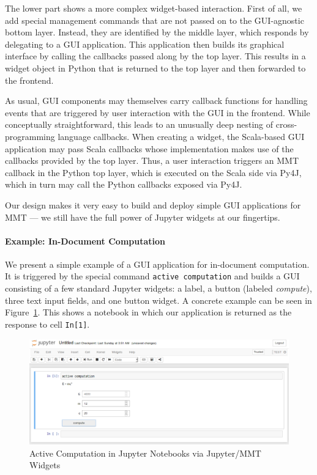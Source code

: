 The lower part shows a more complex widget-based interaction.
First of all, we add special management commands that are not passed on to the GUI-agnostic bottom layer.
Instead, they are identified by the middle layer, which responds by delegating to a GUI application.
This application then builds its graphical interface by calling the callbacks passed along by the top layer.
This results in a widget object in Python that is returned to the top layer and then forwarded to the frontend.

As usual, GUI components may themselves carry callback functions for handling events that are triggered by user interaction with the GUI in the frontend.
While conceptually straightforward, this leads to an unusually deep nesting of cross-programming language callbacks.
When creating a widget, the Scala-based GUI application may pass Scala callbacks whose implementation makes use of the callbacks provided by the top layer.
Thus, a user interaction triggers an MMT callback in the Python top layer, which is executed on the Scala side via Py4J, which in turn may call the Python callbacks exposed via Py4J.

Our design makes it very easy to build and deploy simple GUI applications for MMT --- we still have the full power of Jupyter widgets at our fingertips.

\paragraph*{Example: In-Document Computation}
We present a simple example of a GUI application for in-document computation.
It is triggered by the special command \texttt{active computation} and builds a GUI consisting of a few standard Jupyter widgets: a label, a button (labeled \textit{compute}), three text input fields, and one button widget.
A concrete example can be seen in Figure~\ref{fig:ac}.
This shows a notebook in which our application is returned as the response to cell \texttt{In[1]}.


\begin{figure}[ht]\centering
  \includegraphics[width=15cm]{../D4.11/activecomp}
  \caption{Active Computation in Jupyter Notebooks via Jupyter/MMT Widgets}\label{fig:ac}
\end{figure}

